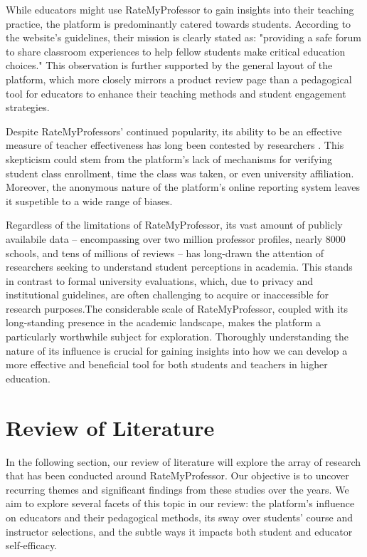 \documentclass[twocolumn, doc,12pt]{apa7}
\begin{document}
While educators might use RateMyProfessor to gain insights into their teaching practice, the platform is predominantly catered towards students. According to the website's guidelines, their mission is clearly stated as: "providing a safe forum to share classroom experiences to help fellow students make critical education choices." This observation is further supported by the general layout of the platform, which more closely mirrors a product review page than a pedagogical tool for educators to enhance their teaching methods and student engagement strategies.

Despite RateMyProfessors' continued popularity, its ability to be an effective measure of teacher effectiveness has long been contested by researchers \textcite{rosen_correlations_2018}. This skepticism could stem from the platform's lack of mechanisms for verifying student class enrollment, time the class was taken, or even university affiliation. Moreover, the anonymous nature of the platform's online reporting system leaves it suspetible to a wide range of biases.

Regardless of the limitations of RateMyProfessor, its vast amount of publicly availabile data -- encompassing over two million professor profiles, nearly 8000 schools, and tens of millions of reviews -- has long-drawn the attention of researchers seeking to understand student perceptions in academia. This stands in contrast to formal university evaluations, which, due to privacy and institutional guidelines, are often challenging to acquire or inaccessible for research purposes.The considerable scale of RateMyProfessor, coupled with its long-standing presence in the academic landscape, makes the platform a particularly worthwhile subject for exploration. Thoroughly understanding the nature of its influence is crucial for gaining insights into how we can develop a more effective and beneficial tool for both students and teachers in higher education.

\section{Review of Literature}
In the following section, our review of literature will explore the array of research that has been conducted around RateMyProfessor. Our objective is to uncover recurring themes and significant findings from these studies over the years. We aim to explore several facets of this topic in our review: the platform’s influence on educators and their pedagogical methods, its sway over students' course and instructor selections, and the subtle ways it impacts both student and educator self-efficacy.
\end{document}
